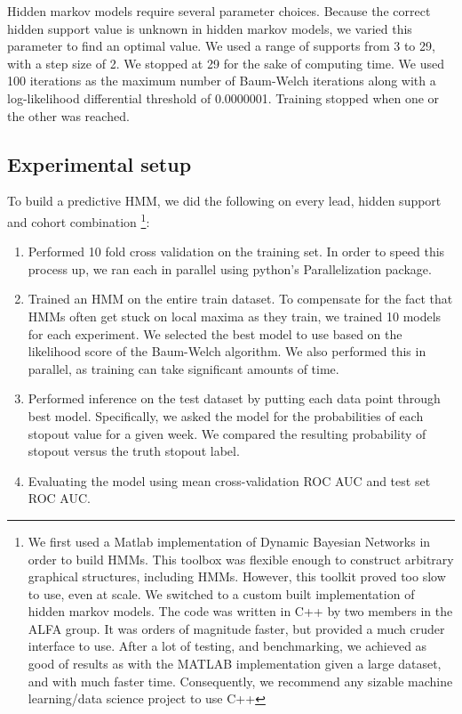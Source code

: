 Hidden markov models require several parameter choices. Because the correct hidden support value is unknown in hidden markov models, we varied this parameter to find an optimal value. We used a range of supports from 3 to 29, with a step size of 2. We stopped at 29 for the sake of computing time. We used 100 iterations as the maximum number of Baum-Welch iterations along with a log-likelihood differential threshold of 0.0000001. Training stopped when one or the other was reached.

\subsection{Experimental setup}
To build a predictive HMM, we did the following on every lead, hidden support and cohort combination
\footnote{We first used a Matlab implementation of Dynamic Bayesian Networks in order to build HMMs. This toolbox was flexible enough to construct arbitrary graphical structures, including HMMs. However, this toolkit proved too slow to use, even at scale. We switched to a custom built implementation of hidden markov models. The code was written in C++ by two members in the ALFA group. It was orders of magnitude faster, but provided a much cruder interface to use. After a lot of testing, and benchmarking, we achieved as good of results as with the MATLAB implementation given a large dataset, and with much faster time. Consequently, we recommend any sizable machine learning/data science project to use C++}:

\begin{enumerate}
\item Performed 10 fold cross validation on the training set. In order to speed this process up, we ran each in parallel using python's Parallelization package.
\item Trained an HMM on the entire train dataset. To compensate for the fact that HMMs often get stuck on local maxima as they train, we trained 10 models for each experiment. We selected the best model to use based on the likelihood score of the Baum-Welch algorithm. We also performed this in parallel, as training can take significant amounts of time.
\item Performed inference on the test dataset by putting each data point through best model. Specifically, we asked the model for the probabilities of each stopout value for a given week. We compared the resulting probability of stopout versus the truth stopout label.
\item Evaluating the model using mean cross-validation ROC AUC and test set ROC AUC.
\end{enumerate}

